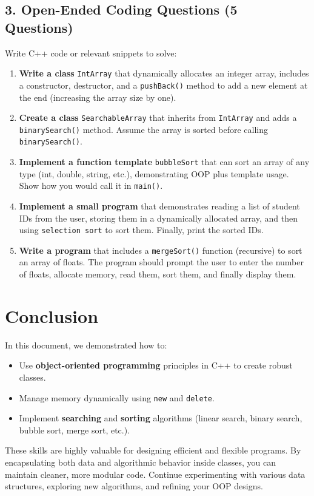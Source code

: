 \documentclass[a4paper,12pt]{article}
\begin{document}
\newpage
\subsection{3. Open-Ended Coding Questions (5 Questions)}
Write C++ code or relevant snippets to solve:

\begin{enumerate}
    \item \textbf{Write a class} \texttt{IntArray} that dynamically allocates an integer array, includes a constructor, destructor, and a \texttt{pushBack()} method to add a new element at the end (increasing the array size by one).

    \item \textbf{Create a class} \texttt{SearchableArray} that inherits from \texttt{IntArray} and adds a \texttt{binarySearch()} method. Assume the array is sorted before calling \texttt{binarySearch()}.

    \item \textbf{Implement a function template} \texttt{bubbleSort} that can sort an array of any type (int, double, string, etc.), demonstrating OOP plus template usage. Show how you would call it in \texttt{main()}.

    \item \textbf{Implement a small program} that demonstrates reading a list of student IDs from the user, storing them in a dynamically allocated array, and then using \texttt{selection sort} to sort them. Finally, print the sorted IDs.

    \item \textbf{Write a program} that includes a \texttt{mergeSort()} function (recursive) to sort an array of floats. The program should prompt the user to enter the number of floats, allocate memory, read them, sort them, and finally display them.
\end{enumerate}


\section{Conclusion}
In this document, we demonstrated how to:
\begin{itemize}
    \item Use \textbf{object-oriented programming} principles in C++ to create robust classes.
    \item Manage memory dynamically using \texttt{new} and \texttt{delete}.
    \item Implement \textbf{searching} and \textbf{sorting} algorithms (linear search, binary search, bubble sort, merge sort, etc.).
\end{itemize}

These skills are highly valuable for designing efficient and flexible programs. By encapsulating both data and algorithmic behavior inside classes, you can maintain cleaner, more modular code. Continue experimenting with various data structures, exploring new algorithms, and refining your OOP designs.
\end{document}

